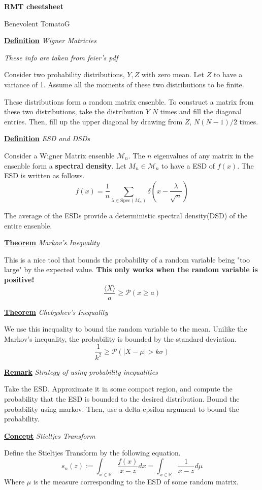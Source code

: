 \documentclass{article}
\newcommand{\new}[2]{
    \vspace{2mm}
    \noindent
    \textbf{
    \underline{#1}}
    \textit{{#2}}
    \vspace{1mm}
    \newline
}
\def\<{{\langle}}
\def\>{{\rangle}}
\begin{document}
\begin{center}
    \Large
    \textbf{RMT cheetsheet}

    \large
    Benevolent TomatoG
\end{center}

\new{Definition} {Wigner Matricies} 
\textit{These info are taken from feier's pdf}

Consider two probability distributions, $Y, Z$ with zero mean. 
Let $Z$ to have a variance of 1. Assume all the moments of 
these two distributions to be finite. 

These distributions form a random matrix ensenble. To construct 
a matrix from these two distributions, take the distribution $Y$ 
$N$ times and fill the diagonal entries. Then, fill up the 
upper diagonal by drawing from $Z$, $N(N-1)/2$ times. 

\new{Definition}{ESD and DSDs}
Consider a Wigner Matrix ensenble $\mathcal{M}_n$. The $n$ 
eigenvalues of any matrix in the ensenble form a \textbf{spectral density}. 
Let $M_n \in \mathcal M_n$ to have a ESD of $f(x)$. The ESD is written as follows. 
\[
    f(x) = \frac 1 n \sum_{\lambda \in \text{Spec}(M_n)} \delta(x - \frac \lambda {\sqrt n}) 
\]

The average of the ESDs provide a deterministic spectral density(DSD) of 
the entire ensenble. 

\new{Theorem}{Markov's Inequality}
This is a nice tool that bounds the probability of a random variable 
being "too large" by the expected value. \textbf{This only works when 
the random variable is positive!}
\[
    \frac{\<X\>} a \geq \mathcal{P}(x \geq a) 
\]

\new{Theorem}{Chebyshev's Inequality}
We use this inequality to bound the random variable to the mean. Unilike 
the Markov's inequality, the probability is bounded by the standard deviation. 
\[
    \frac 1 {k^2} \geq \mathcal{P}(|X - \mu| > k\sigma) 
\]

\new{Remark} {Strategy of using probability inequalities}
Take the ESD. Approximate it in some compact region, and compute the probability 
that the ESD is bounded to the desired distribution. Bound the probability using markov. 
Then, use a delta-epsilon argument to bound the probability. 

\newcommand{\Sp}{
    \text{Spec}
}

\newcommand{\tr}{
    \text{tr}
}

\new{Concept} {Stieltjes Transform}

Define the Stieltjes Transform by the following equation. 
\[
    s_n(z) := \int_{x \in \mathbb{R}} \frac{f(x)}{x-z}dx 
    = \int_{x \in \mathbb{R}} \frac{1}{x-z}d\mu 
\]
Where $\mu$ is the measure corresponding to the ESD of some random matrix. 
\end{document}
